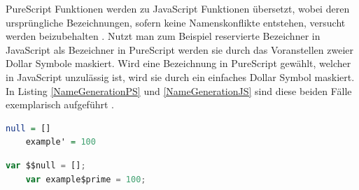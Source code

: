 \documentclass[
12pt,
ngerman,
oneside]
{scrbook} %
\begin{document}
PureScript Funktionen werden zu JavaScript Funktionen übersetzt, wobei deren ursprüngliche Bezeichnungen, sofern keine Namenskonflikte entstehen, versucht werden beizubehalten \cite[][S. 10]{Freeman17}. Nutzt man zum Beispiel reservierte Bezeichner in JavaScript als Bezeichner in PureScript werden sie durch das Voranstellen zweier Dollar Symbole maskiert. Wird eine Bezeichnung in PureScript gewählt, welcher in JavaScript unzulässig ist, wird sie durch ein einfaches Dollar Symbol maskiert. In Listing \ref{NameGenerationPS} und \ref{NameGenerationJS} sind diese beiden Fälle exemplarisch aufgeführt \cite[][S. 144]{Freeman17}.

\noindent\begin{minipage}[t]{.49\textwidth} 
	\hspace*{0pt}\begin{lstlisting}[language=purescript, style=only-rect, caption= Name Generation PS, label=NameGenerationPS]
	null = []
	example' = 100
	\end{lstlisting}
\end{minipage}%
% 
\hfill%
\begin{minipage}[t]{.49\textwidth} 
	\hspace*{0pt}\begin{lstlisting}[language=javascript, style=only-rect, caption= Name Generation JS, label=NameGenerationJS] 
	var $$null = [];
	var example$prime = 100;
	\end{lstlisting}
\end{minipage}
\hfill%
\end{document}
